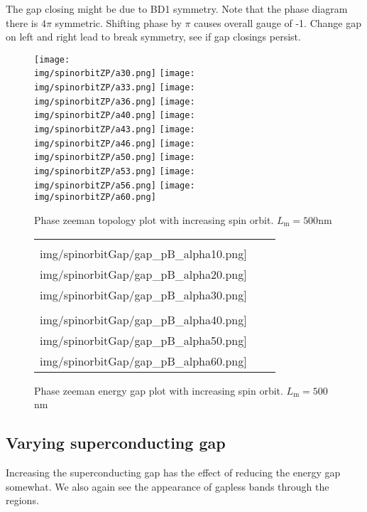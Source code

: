 \documentclass[10pt,a4paper]{article}
\newcommand{\img}{./images}
\begin{document}
	The gap closing might be due to BD1 symmetry. Note that the phase diagram there is $4\pi$ symmetric. Shifting phase by $\pi$ causes overall gauge of -1. Change gap on left and right lead to break symmetry, see if gap closings persist.
	
		\begin{figure}[H]
			\texttt{[image: \\img/spinorbitZP/a30.png]}
			\texttt{[image: \\img/spinorbitZP/a33.png]}
			\texttt{[image: \\img/spinorbitZP/a36.png]}
			\texttt{[image: \\img/spinorbitZP/a40.png]}
			\texttt{[image: \\img/spinorbitZP/a43.png]}
			\texttt{[image: \\img/spinorbitZP/a46.png]}
			\texttt{[image: \\img/spinorbitZP/a50.png]}
			\texttt{[image: \\img/spinorbitZP/a53.png]}
			\texttt{[image: \\img/spinorbitZP/a56.png]}
			\texttt{[image: \\img/spinorbitZP/a60.png]}
			\caption{Phase zeeman topology plot with increasing spin orbit. $L_\text{m}=500$nm}
			\label{fig:pfaf_pB_soi}
		\end{figure}
	
		\begin{figure}[H]
			\begin{tabular}{ccc}
				\texttt{[image: \\img/spinorbitGap/gap\_pB\_alpha10.png]}&
				\texttt{[image: \\img/spinorbitGap/gap\_pB\_alpha20.png]}&
				\texttt{[image: \\img/spinorbitGap/gap\_pB\_alpha30.png]}\\
				\texttt{[image: \\img/spinorbitGap/gap\_pB\_alpha40.png]}&
				\texttt{[image: \\img/spinorbitGap/gap\_pB\_alpha50.png]}&
				\texttt{[image: \\img/spinorbitGap/gap\_pB\_alpha60.png]}\\
			\end{tabular}
			\caption{Phase zeeman energy gap plot with increasing spin orbit. $L_\text{m}=500$nm}
			\label{fig:gap_pB_soi}
		\end{figure}
\newpage	
	\subsection{Varying superconducting gap}
	Increasing the superconducting gap has the effect of reducing the energy gap somewhat. We also again see the appearance of gapless bands through the regions.
	
\end{document}
